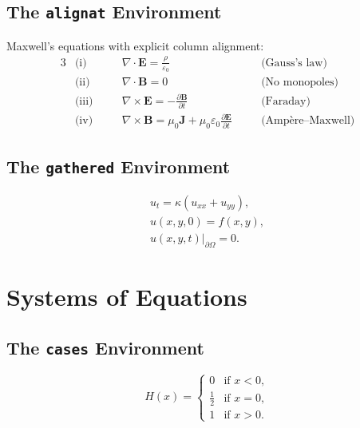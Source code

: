 \documentclass[
    language=english,
    doctype=article,
    institution=none,
    titlestyle=book,
]{../../omnilatex}
\theoremstyle{plain}
\theoremstyle{definition}
\theoremstyle{remark}
\begin{document}
\subsection{The \texttt{alignat} Environment}

Maxwell's equations with explicit column alignment:
\begin{alignat}{3}
    &\text{(i)} \quad &&\nabla \cdot \mathbf{E} = \frac{\rho}{\varepsilon_0} \quad &&\text{(Gauss's law)} \label{eq:maxwell1}\\
    &\text{(ii)} \quad &&\nabla \cdot \mathbf{B} = 0 \quad &&\text{(No monopoles)} \label{eq:maxwell2}\\
    &\text{(iii)} \quad &&\nabla \times \mathbf{E} = -\frac{\partial \mathbf{B}}{\partial t} \quad &&\text{(Faraday)} \label{eq:maxwell3}\\
    &\text{(iv)} \quad &&\nabla \times \mathbf{B} = \mu_0\mathbf{J} + \mu_0\varepsilon_0\frac{\partial \mathbf{E}}{\partial t} \quad &&\text{(Amp\`ere--Maxwell)} \label{eq:maxwell4}
\end{alignat}

\subsection{The \texttt{gathered} Environment}

\begin{equation}\label{eq:gathered-example}
    \begin{gathered}
        u_t = \kappa(u_{xx} + u_{yy}), \\
        u(x, y, 0) = f(x, y), \\
        u(x, y, t)\big|_{\partial\Omega} = 0.
    \end{gathered}
\end{equation}

\section{Systems of Equations}
\label{sec:systems}

\subsection{The \texttt{cases} Environment}

\begin{equation}\label{eq:heaviside}
    H(x) = \begin{cases}
        0 & \text{if } x < 0, \\
        \frac{1}{2} & \text{if } x = 0, \\
        1 & \text{if } x > 0.
    \end{cases}
\end{equation}
\end{document}
